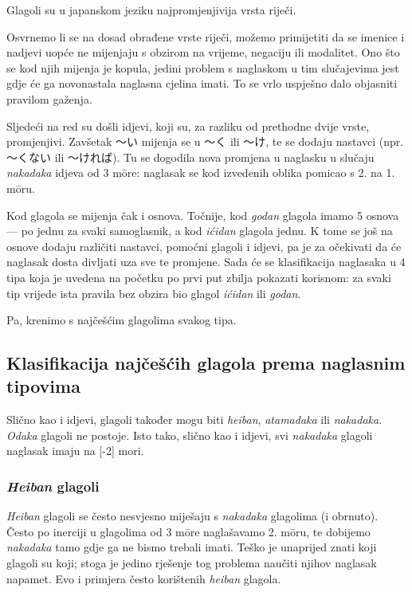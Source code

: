 \label{sec:glagoli}
Glagoli su u japanskom jeziku najpromjenjivija vrsta riječi.

Osvrnemo li se na dosad obrađene vrste riječi, možemo primijetiti da se imenice i nadjevi uopće ne mijenjaju s obzirom na vrijeme, negaciju ili modalitet.
Ono što se kod njih mijenja je kopula, jedini problem s naglaskom u tim slučajevima jest gdje će ga novonastala naglasna cjelina imati.
To se vrlo uspješno dalo objasniti pravilom gaženja.

Sljedeći na red su došli idjevi, koji su, za razliku od prethodne dvije vrste, promjenjivi.
Zavšetak 〜い mijenja se u 〜く ili 〜け, te se dodaju nastavci (npr. 〜くない ili 〜ければ).
Tu se dogodila nova promjena u naglasku u slučaju \textit{nakadaka} idjeva od 3 m\=ore: naglasak se kod izvedenih oblika pomicao s 2. na 1. m\=oru.

Kod glagola se mijenja čak i osnova.
Točnije, kod \textit{godan} glagola imamo 5 osnova --- po jednu za svaki samoglasnik, a kod \textit{ićidan} glagola jednu.
K tome se još na osnove dodaju različiti nastavci, pomoćni glagoli i idjevi, pa je za očekivati da će naglasak dosta divljati uza sve te promjene.
Sada će se klasifikacija naglasaka u 4 tipa koja je uvedena na početku po prvi put zbilja pokazati korisnom: za svaki tip vrijede ista pravila bez obzira bio glagol \textit{ićidan} ili \textit{godan}.

Pa, krenimo s najčešćim glagolima svakog tipa.

\subsection{Klasifikacija najčešćih glagola prema naglasnim tipovima}
Slično kao i idjevi, glagoli također mogu biti \textit{heiban}, \textit{atamadaka} ili \textit{nakadaka}.
\textit{Odaka} glagoli ne postoje.
Isto tako, slično kao i idjevi, svi \textit{nakadaka} glagoli naglasak imaju na [-2] mori.

\subsubsection*{\textit{Heiban} glagoli}
\textit{Heiban} glagoli se često nesvjesno miješaju s \textit{nakadaka} glagolima (i obrnuto).
Često po inerciji u glagolima od 3 m\=ore naglašavamo 2. m\=oru, te dobijemo \textit{nakadaka} tamo gdje ga ne bismo trebali imati.
Teško je unaprijed znati koji glagoli su koji; stoga je jedino rješenje tog problema naučiti njihov naglasak napamet.
Evo i primjera često korištenih \textit{heiban} glagola.

